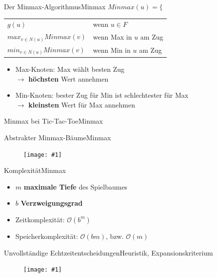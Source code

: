 \documentclass[18pt, aspectratio=169, handout]{beamer}
\newcommand\gw[2]{%
  \begin{figure}[!ht]
  \centering
  \texttt{[image: \#1]}
  {\small#2}
  \end{figure}}
\newcommand\gh[2]{%
  \begin{figure}[!ht]
  \centering
  \texttt{[image: \#1]}
  {\small#2}
  \end{figure}}
\begin{document}
\begin{frame}{Der Minmax-Algorithmus}{Minmax}
$Minmax(u) = \Bigg\{$
	  \begin{tabular}{ll}
		  $g(u)$ & wenn $u \in F$\\
		  $max_{v \in N(u)} Minmax(v)$ & wenn Max in $u$ am Zug\\
		  $min_{v \in N(u)} Minmax(v)$ & wenn Min in $u$ am Zug
	  \end{tabular}

	  \vspace{2\baselineskip}
	  \pause

	\begin{itemize}
    \item
      Max-Knoten: Max wählt besten Zug \\
      $\rightarrow$ \textbf{höchsten} Wert annehmen
    \item
      Min-Knoten: bester Zug für Min ist schlechtester für Max \\
      $\rightarrow$ \textbf{kleinsten} Wert für Max annehmen
  \end{itemize}
\end{frame}

\begin{frame}{Minmax bei Tic-Tac-Toe}{Minmax}
	\only<1>{\gh{img/tic_minmax.pdf}{}}
	\only<2->{\gh{img/tic_minmax_2.pdf}{}}
	\pause
\end{frame}

\begin{frame}{Abstrakter Minmax-Bäume}{Minmax}
	\gw{minmax.pdf}{}
\end{frame}

\begin{frame}{Komplexität}{Minmax}
	\begin{itemize}
		\item
		  $m$ \quad \textbf{maximale Tiefe} des Spielbaumes
		\item
		  $b$ \quad \textbf{Verzweigungsgrad}
		  \pause
		\item
		  Zeitkomplexität: $\mathcal{O}(b^m)$
		\item
		  Speicherkomplexität: $\mathcal{O}(bm)$, bzw. $\mathcal{O}(m)$
	\end{itemize}
\end{frame}



\begin{frame}{Unvollständige Echtzeitentscheidungen}{Heuristik, Expansionskriterium}
  \gw{a/agenda_diagram_Echt.pdf}{}
\end{frame}
\end{document}
